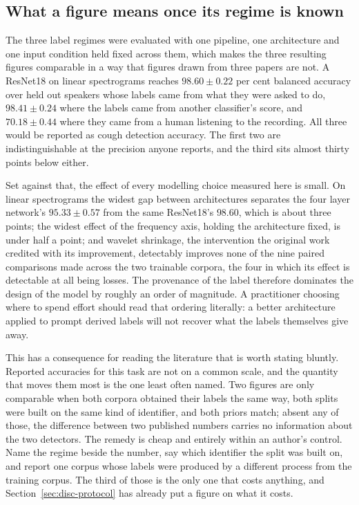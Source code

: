 \documentclass{ieeeaccess}
\begin{document}
\subsection{What a figure means once its regime is known}\label{sec:disc-regime}

The three label regimes were evaluated with one pipeline, one architecture and one input
condition held fixed across them, which makes the three resulting figures comparable in a
way that figures drawn from three papers are not. A ResNet18 on linear spectrograms
reaches $98.60 \pm 0.22$ per cent balanced accuracy over held out speakers whose labels
came from what they were asked to do, $98.41 \pm 0.24$ where the labels came from another
classifier's score, and $70.18 \pm 0.44$ where they came from a human listening to the
recording. All three would be reported as cough detection accuracy. The first two are
indistinguishable at the precision anyone reports, and the third sits almost thirty points
below either.

Set against that, the effect of every modelling choice measured here is small. On linear
spectrograms the widest gap between architectures separates the four layer network's
$95.33 \pm 0.57$ from the same ResNet18's $98.60$, which is about three points; the widest
effect of the frequency axis, holding the architecture fixed, is under half a point; and
wavelet shrinkage, the intervention the original work credited with its improvement,
detectably improves none of the nine paired comparisons made across the two trainable
corpora, the four in which its effect is detectable at all being losses. The provenance of the label
therefore dominates the design of the model by roughly an order of magnitude. A
practitioner choosing where to spend effort
should read that ordering literally: a better architecture applied to prompt derived
labels will not recover what the labels themselves give away.

This has a consequence for reading the literature that is worth stating bluntly. Reported
accuracies for this task are not on a common scale, and the quantity that moves them most
is the one least often named. Two figures are only comparable when both corpora obtained
their labels the same way, both splits were built on the same kind of identifier, and both
priors match; absent any of those, the difference between two published numbers carries no
information about the two detectors. The remedy is cheap and entirely within an author's
control. Name the regime beside the number, say which identifier the split was built on,
and report one corpus whose labels were produced by a different process from the training
corpus. The third of those is the only one that costs anything, and
Section~\ref{sec:disc-protocol} has already put a figure on what it costs.
\end{document}
